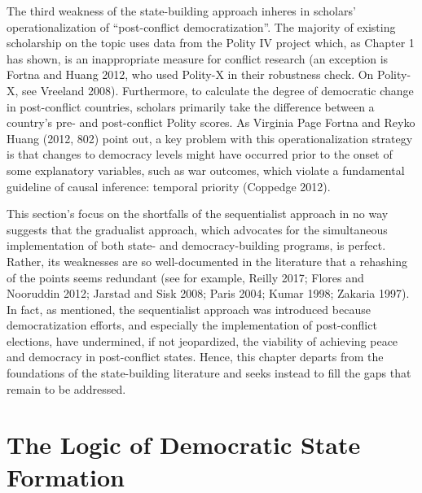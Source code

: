 \documentclass [11pt]{article}
\begin{document}
The third weakness of the state-building approach inheres in scholars' operationalization of ``post-conflict democratization''. The majority of existing scholarship on the topic uses data from the Polity IV project which, as Chapter 1 has shown, is an inappropriate measure for conflict research (an exception is Fortna and Huang 2012, who used Polity-X in their robustness check. On Polity-X, see Vreeland 2008). Furthermore, to calculate the degree of democratic change in post-conflict countries, scholars primarily take the difference between a country's pre- and post-conflict Polity scores. As Virginia Page Fortna and Reyko Huang (2012, 802) point out, a key problem with this operationalization strategy is that changes to democracy levels might have occurred prior to the onset of some explanatory variables, such as war outcomes, which violate a fundamental guideline of causal inference: temporal priority (Coppedge 2012).

This section's focus on the shortfalls of the sequentialist approach in no way suggests that the gradualist approach, which advocates for the simultaneous implementation of both state- and democracy-building programs, is perfect. Rather, its weaknesses are so well-documented in the literature that a rehashing of the points seems redundant (see for example, Reilly 2017; Flores and Nooruddin 2012; Jarstad and Sisk 2008; Paris 2004; Kumar 1998; Zakaria 1997). In fact, as mentioned, the sequentialist approach was introduced because democratization efforts, and especially the implementation of post-conflict elections, have undermined, if not jeopardized, the viability of achieving peace and democracy in post-conflict states. Hence, this chapter departs from the foundations of the state-building literature and seeks instead to fill the gaps that remain to be addressed.

\section*{The Logic of Democratic State Formation}



\end{document}
